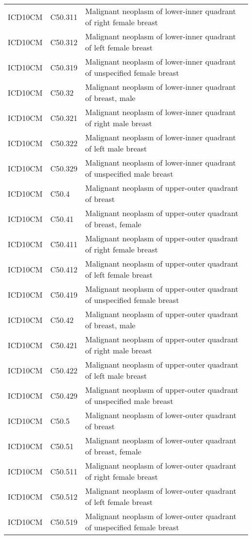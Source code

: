 \begin{table}[ht]
\begin{tabular}{lll}
  ICD10CM & C50.311 & Malignant neoplasm of lower-inner quadrant of right female breast \\ 
  ICD10CM & C50.312 & Malignant neoplasm of lower-inner quadrant of left female breast \\ 
  ICD10CM & C50.319 & Malignant neoplasm of lower-inner quadrant of unspecified female breast \\ 
  ICD10CM & C50.32 & Malignant neoplasm of lower-inner quadrant of breast, male \\ 
  ICD10CM & C50.321 & Malignant neoplasm of lower-inner quadrant of right male breast \\ 
  ICD10CM & C50.322 & Malignant neoplasm of lower-inner quadrant of left male breast \\ 
  ICD10CM & C50.329 & Malignant neoplasm of lower-inner quadrant of unspecified male breast \\ 
  ICD10CM & C50.4 & Malignant neoplasm of upper-outer quadrant of breast \\ 
  ICD10CM & C50.41 & Malignant neoplasm of upper-outer quadrant of breast, female \\ 
  ICD10CM & C50.411 & Malignant neoplasm of upper-outer quadrant of right female breast \\ 
  ICD10CM & C50.412 & Malignant neoplasm of upper-outer quadrant of left female breast \\ 
  ICD10CM & C50.419 & Malignant neoplasm of upper-outer quadrant of unspecified female breast \\ 
  ICD10CM & C50.42 & Malignant neoplasm of upper-outer quadrant of breast, male \\ 
  ICD10CM & C50.421 & Malignant neoplasm of upper-outer quadrant of right male breast \\ 
  ICD10CM & C50.422 & Malignant neoplasm of upper-outer quadrant of left male breast \\ 
  ICD10CM & C50.429 & Malignant neoplasm of upper-outer quadrant of unspecified male breast \\ 
  ICD10CM & C50.5 & Malignant neoplasm of lower-outer quadrant of breast \\ 
  ICD10CM & C50.51 & Malignant neoplasm of lower-outer quadrant of breast, female \\ 
  ICD10CM & C50.511 & Malignant neoplasm of lower-outer quadrant of right female breast \\ 
  ICD10CM & C50.512 & Malignant neoplasm of lower-outer quadrant of left female breast \\ 
  ICD10CM & C50.519 & Malignant neoplasm of lower-outer quadrant of unspecified female breast \\ 

\end{tabular}
\end{table}

